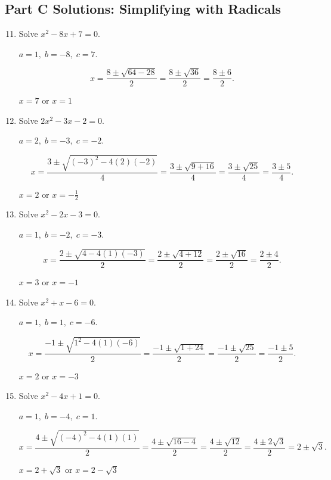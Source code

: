 \documentclass[14pt]{extarticle}
\begin{document}
\subsection*{Part C Solutions: Simplifying with Radicals}
\begin{enumerate}
  \setcounter{enumi}{10}
  \item Solve \(x^2 - 8x + 7 = 0.\)

  \(a = 1,\; b = -8,\; c = 7.\)

  \[
  x = \frac{8 \pm \sqrt{64 - 28}}{2}
  = \frac{8 \pm \sqrt{36}}{2}
  = \frac{8 \pm 6}{2}.
  \]

  \(\boxed{x = 7 \text{ or } x = 1}\)

  \item Solve \(2x^2 - 3x - 2 = 0.\)

  \(a = 2,\; b = -3,\; c = -2.\)

  \[
  x = \frac{3 \pm \sqrt{(-3)^2 - 4(2)(-2)}}{4}
  = \frac{3 \pm \sqrt{9 + 16}}{4}
  = \frac{3 \pm \sqrt{25}}{4}
  = \frac{3 \pm 5}{4}.
  \]

  \(\boxed{x = 2 \text{ or } x = -\tfrac{1}{2}}\)

  \item Solve \(x^2 - 2x - 3 = 0.\)

  \(a = 1,\; b = -2,\; c = -3.\)

  \[
  x = \frac{2 \pm \sqrt{4 - 4(1)(-3)}}{2}
  = \frac{2 \pm \sqrt{4 + 12}}{2}
  = \frac{2 \pm \sqrt{16}}{2}
  = \frac{2 \pm 4}{2}.
  \]

  \(\boxed{x = 3 \text{ or } x = -1}\)

  \item Solve \(x^2 + x - 6 = 0.\)

  \(a = 1,\; b = 1,\; c = -6.\)

  \[
  x = \frac{-1 \pm \sqrt{1^2 - 4(1)(-6)}}{2}
  = \frac{-1 \pm \sqrt{1 + 24}}{2}
  = \frac{-1 \pm \sqrt{25}}{2}
  = \frac{-1 \pm 5}{2}.
  \]

  \(\boxed{x = 2 \text{ or } x = -3}\)

  \item Solve \(x^2 - 4x + 1 = 0.\)

  \(a = 1,\; b = -4,\; c = 1.\)

  \[
  x = \frac{4 \pm \sqrt{(-4)^2 - 4(1)(1)}}{2}
  = \frac{4 \pm \sqrt{16 - 4}}{2}
  = \frac{4 \pm \sqrt{12}}{2}
  = \frac{4 \pm 2\sqrt{3}}{2}
  = 2 \pm \sqrt{3}.
  \]

  \(\boxed{x = 2 + \sqrt{3} \text{ or } x = 2 - \sqrt{3}}\)
\end{enumerate}
\end{document}
